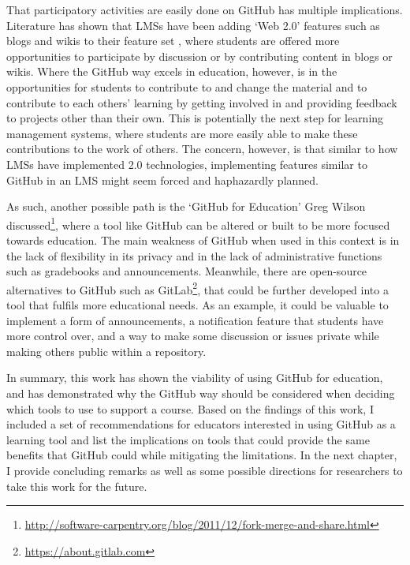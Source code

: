 That participatory activities are easily done on GitHub has multiple implications. Literature has shown that LMSs have been adding `Web 2.0' features such as blogs and wikis to their feature set \cite{downes2005feature}, where students are offered more opportunities to participate by discussion or by contributing content in blogs or wikis. Where the GitHub way excels in education, however, is in the opportunities for students to contribute to and change the material and to contribute to each others' learning by getting involved in and providing feedback to projects other than their own. This is potentially the next step for learning management systems, where students are more easily able to make these contributions to the work of others. The concern, however, is that similar to how LMSs have implemented 2.0 technologies, implementing features similar to GitHub in an LMS might seem forced and haphazardly planned.

As such, another possible path is the `GitHub for Education' Greg Wilson discussed\footnote{\url{http://software-carpentry.org/blog/2011/12/fork-merge-and-share.html}}, where a tool like GitHub can be altered or built to be more focused towards education. The main weakness of GitHub when used in this context is in the lack of flexibility in its privacy and in the lack of administrative functions such as gradebooks and announcements. Meanwhile, there are open-source alternatives to GitHub such as GitLab\footnote{\url{https://about.gitlab.com}}, that could be further developed into a tool that fulfils more educational needs. As an example, it could be valuable to implement a form of announcements, a notification feature that students have more control over, and a way to make some discussion or issues private while making others public within a repository.

In summary, this work has shown the viability of using GitHub for education, and has demonstrated why the GitHub way should be considered when deciding which tools to use to support a course. Based on the findings of this work, I included a set of recommendations for educators interested in using GitHub as a learning tool and list the implications on tools that could provide the same benefits that GitHub could while mitigating the limitations. In the next chapter, I provide concluding remarks as well as some possible directions for researchers to take this work for the future.


